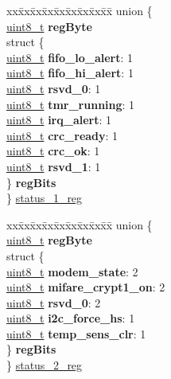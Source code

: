 \begin{DoxyCompactItemize}
\begin{tabbing}
\end{tabbing}\item 
\begin{tabbing}
xx\=xx\=xx\=xx\=xx\=xx\=xx\=xx\=xx\=\kill
union \{\\
\>\hyperlink{vl53l0x__types_8h_aba7bc1797add20fe3efdf37ced1182c5}{uint8\_t} {\bfseries regByte}\\
\>struct \{\\
\>\>\hyperlink{vl53l0x__types_8h_aba7bc1797add20fe3efdf37ced1182c5}{uint8\_t} {\bfseries fifo\_lo\_alert}: 1\\
\>\>\hyperlink{vl53l0x__types_8h_aba7bc1797add20fe3efdf37ced1182c5}{uint8\_t} {\bfseries fifo\_hi\_alert}: 1\\
\>\>\hyperlink{vl53l0x__types_8h_aba7bc1797add20fe3efdf37ced1182c5}{uint8\_t} {\bfseries rsvd\_0}: 1\\
\>\>\hyperlink{vl53l0x__types_8h_aba7bc1797add20fe3efdf37ced1182c5}{uint8\_t} {\bfseries tmr\_running}: 1\\
\>\>\hyperlink{vl53l0x__types_8h_aba7bc1797add20fe3efdf37ced1182c5}{uint8\_t} {\bfseries irq\_alert}: 1\\
\>\>\hyperlink{vl53l0x__types_8h_aba7bc1797add20fe3efdf37ced1182c5}{uint8\_t} {\bfseries crc\_ready}: 1\\
\>\>\hyperlink{vl53l0x__types_8h_aba7bc1797add20fe3efdf37ced1182c5}{uint8\_t} {\bfseries crc\_ok}: 1\\
\>\>\hyperlink{vl53l0x__types_8h_aba7bc1797add20fe3efdf37ced1182c5}{uint8\_t} {\bfseries rsvd\_1}: 1\\
\>\} {\bfseries regBits}\\
\} \hyperlink{structstruct_a3af413aba8342123dc8bd7d2d5e6663c}{status\_1\_reg}\\

\end{tabbing}\item 
\begin{tabbing}
xx\=xx\=xx\=xx\=xx\=xx\=xx\=xx\=xx\=\kill
union \{\\
\>\hyperlink{vl53l0x__types_8h_aba7bc1797add20fe3efdf37ced1182c5}{uint8\_t} {\bfseries regByte}\\
\>struct \{\\
\>\>\hyperlink{vl53l0x__types_8h_aba7bc1797add20fe3efdf37ced1182c5}{uint8\_t} {\bfseries modem\_state}: 2\\
\>\>\hyperlink{vl53l0x__types_8h_aba7bc1797add20fe3efdf37ced1182c5}{uint8\_t} {\bfseries mifare\_crypt1\_on}: 2\\
\>\>\hyperlink{vl53l0x__types_8h_aba7bc1797add20fe3efdf37ced1182c5}{uint8\_t} {\bfseries rsvd\_0}: 2\\
\>\>\hyperlink{vl53l0x__types_8h_aba7bc1797add20fe3efdf37ced1182c5}{uint8\_t} {\bfseries i2c\_force\_hs}: 1\\
\>\>\hyperlink{vl53l0x__types_8h_aba7bc1797add20fe3efdf37ced1182c5}{uint8\_t} {\bfseries temp\_sens\_clr}: 1\\
\>\} {\bfseries regBits}\\
\} \hyperlink{structstruct_a01781aef0edd49d172a2b5df5ec1c138}{status\_2\_reg}\\


\end{tabbing}
\end{DoxyCompactItemize}
